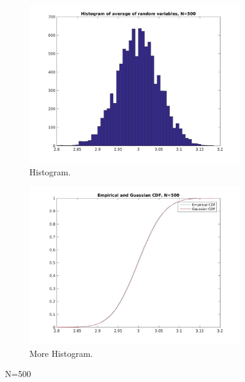 \documentclass[12pt]{article}
\begin{document}
\begin{figure}[h!]
  \centering
  \begin{subfigure}[b]{0.4\linewidth}
    \includegraphics[width=\linewidth]{jpgs/histograms/500_hist.jpg}
    \caption{Histogram.}
  \end{subfigure}
  \begin{subfigure}[b]{0.4\linewidth}
    \includegraphics[width=\linewidth]{jpgs/cdfs/500_cdf.jpg}
    \caption{More Histogram.}
  \end{subfigure}
  \caption{N=500}
\end{figure}
\end{document}
